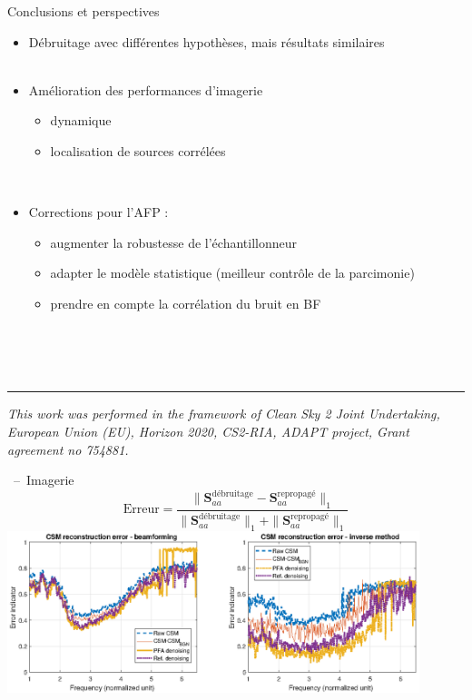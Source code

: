 \documentclass[10pt,xcolor=x11names,compress, show notes]{beamer}%
\begin{document}
\begin{frame}{Conclusions et perspectives}
\begin{itemize}
	\item Débruitage avec différentes hypothèses, mais résultats similaires\\~\\
        \item Amélioration des performances d'imagerie
        \begin{itemize}
       		 \item dynamique
        		\item localisation de sources corrélées
	\end{itemize}~\\
	
	\item Corrections pour l'AFP :
	\begin{itemize}
        		\item augmenter la robustesse de l'échantillonneur
        		\item adapter le modèle statistique (meilleur contrôle de la parcimonie)
        		\item prendre en compte la corrélation du bruit en BF
	\end{itemize}
\end{itemize}

~\\~\\~\\
\vfill

\begin{center}
	\noindent\rule{\textwidth}{0.4pt}
	\scriptsize \itshape{
	This work was performed in the framework of Clean Sky 2 Joint Undertaking, European Union (EU), Horizon 2020, CS2-RIA, ADAPT project, Grant agreement no 754881.}\\
\end{center}

\end{frame}

\begin{frame}{\insertsectionhead~--~Imagerie}
	\centering
	\small
	\begin{equation*}
        		\text{Erreur} = \frac{\|\bm{S}_{aa}^{\text{débruitage}}-\bm{S}_{aa}^{\text{repropagé}}\|_1}{\|\bm{S}_{aa}^{\text{débruitage}}\|_1+\|\bm{S}_{aa}^{\text{repropagé}}\|_1}
	\end{equation*}
	\vfill
	\includegraphics[width=0.9\textwidth]{airbus/erreur.eps}
\end{frame}
\end{document}
